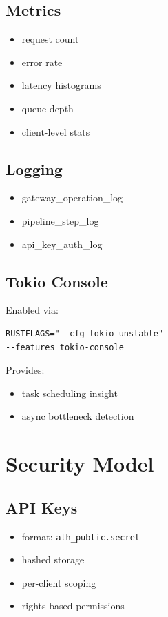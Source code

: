 \documentclass[11pt,a4paper]{article}
\begin{document}
\subsection{Metrics}

\begin{itemize}
\item request count
\item error rate
\item latency histograms
\item queue depth
\item client-level stats
\end{itemize}

\subsection{Logging}

\begin{itemize}
\item gateway\_operation\_log
\item pipeline\_step\_log
\item api\_key\_auth\_log
\end{itemize}

\subsection{Tokio Console}

Enabled via:

\begin{verbatim}
RUSTFLAGS="--cfg tokio_unstable"
--features tokio-console
\end{verbatim}

Provides:

\begin{itemize}
\item task scheduling insight
\item async bottleneck detection
\end{itemize}

\newpage

\section{Security Model}

\subsection{API Keys}

\begin{itemize}
\item format: \texttt{ath\_{public}.{secret}}
\item hashed storage
\item per-client scoping
\item rights-based permissions
\end{itemize}
\end{document}
